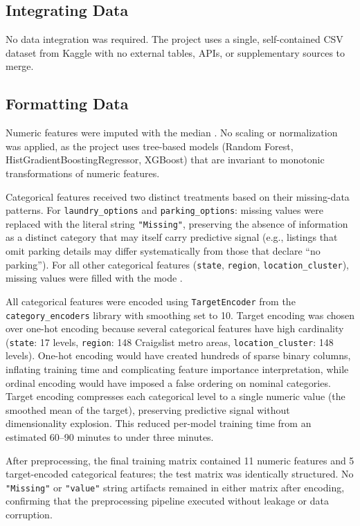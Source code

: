 \subsection{Integrating Data}
\label{subsec:Integrating Data}
\noindent
No data integration was required. The project uses a single, self-contained CSV dataset from Kaggle with no external tables, APIs, or supplementary sources to merge.


\subsection{Formatting Data}
\label{subsec:Formatting Data}
\noindent
Numeric features were imputed with the median%
. No scaling or normalization was applied, as the project uses tree-based models (Random Forest, HistGradientBoostingRegressor, XGBoost) that are invariant to monotonic transformations of numeric features.

\noindent
Categorical features received two distinct treatments based on their missing-data patterns. For \texttt{laundry\_options} and \texttt{parking\_options}: missing values were replaced with the literal string \texttt{"Missing"}, preserving the absence of information as a distinct category that may itself carry predictive signal (e.g., listings that omit parking details may differ systematically from those that declare ``no parking''). For all other categorical features (\texttt{state}, \texttt{region}, \texttt{location\_cluster}), missing values were filled with the mode%
.

\noindent
All categorical features were encoded using \texttt{TargetEncoder} from the \texttt{category\_encoders} library with smoothing set to 10. Target encoding was chosen over one-hot encoding because several categorical features have high cardinality (\texttt{state}: 17 levels, \texttt{region}: 148 Craigslist metro areas, \texttt{location\_cluster}: 148 levels). One-hot encoding would have created hundreds of sparse binary columns, inflating training time and complicating feature importance interpretation, while ordinal encoding would have imposed a false ordering on nominal categories. Target encoding compresses each categorical level to a single numeric value (the smoothed mean of the target), preserving predictive signal without dimensionality explosion. This reduced per-model training time from an estimated 60--90 minutes to under three minutes.

\noindent
After preprocessing, the final training matrix contained 11 numeric features and 5 target-encoded categorical features; the test matrix was identically structured. No \texttt{"Missing"} or \texttt{"value"} string artifacts remained in either matrix after encoding, confirming that the preprocessing pipeline executed without leakage or data corruption.
